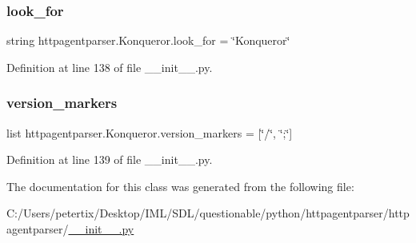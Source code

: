 \subsubsection{\texorpdfstring{look\+\_\+for}{look\_for}}
{\footnotesize\ttfamily string httpagentparser.\+Konqueror.\+look\+\_\+for = \char`\"{}Konqueror\char`\"{}\hspace{0.3cm}{\ttfamily [static]}}



Definition at line 138 of file \+\_\+\+\_\+init\+\_\+\+\_\+.\+py.

\hypertarget{classhttpagentparser_1_1_konqueror_ab4f1d229662963bcc4a00a674d3a9fe7}{}\label{classhttpagentparser_1_1_konqueror_ab4f1d229662963bcc4a00a674d3a9fe7} 
\subsubsection{\texorpdfstring{version\+\_\+markers}{version\_markers}}
{\footnotesize\ttfamily list httpagentparser.\+Konqueror.\+version\+\_\+markers = \mbox{[}\char`\"{}/\char`\"{}, \char`\"{};\char`\"{}\mbox{]}\hspace{0.3cm}{\ttfamily [static]}}



Definition at line 139 of file \+\_\+\+\_\+init\+\_\+\+\_\+.\+py.



The documentation for this class was generated from the following file\+:\begin{DoxyCompactItemize}
\item 
C\+:/\+Users/petertix/\+Desktop/\+I\+M\+L/\+S\+D\+L/questionable/python/httpagentparser/httpagentparser/\hyperlink{____init_____8py}{\+\_\+\+\_\+init\+\_\+\+\_\+.\+py}\end{DoxyCompactItemize}
